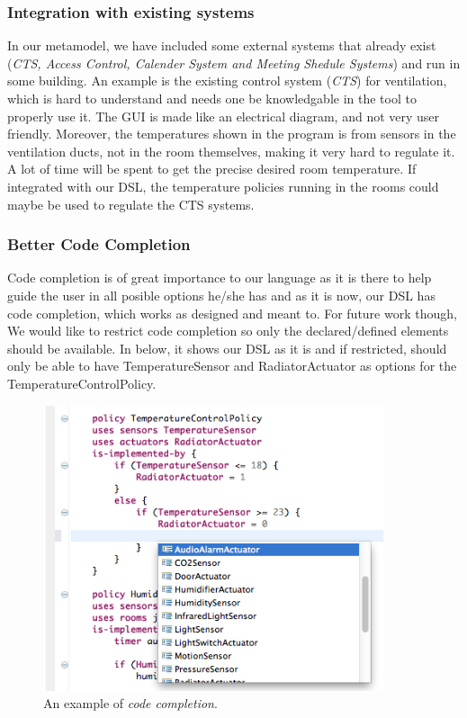 \documentclass{llncs}
\begin{document}
\subsubsection{Integration with existing systems}\label{subsec:integration}
In our metamodel, we have included some external systems that already exist (\textit{CTS, Access Control, Calender System and Meeting Shedule Systems}) and run in some building. An example is the existing control system (\textit{CTS}) for ventilation, which is hard to understand and needs one be knowledgable in the tool to properly use it. The GUI is made like an electrical diagram, and not very user friendly. Moreover, the temperatures shown in the program is from sensors in the ventilation ducts, not in the room themselves, making it very hard to regulate it. A lot of time will be spent to get the precise desired room temperature. If integrated with our DSL, the temperature policies running in the rooms could maybe be used to regulate the CTS systems.

\subsubsection{Better Code Completion}\label{subsec:codecompletion}
Code completion is of great importance to our language as it is there to help guide the user in all posible options he/she has and as it is now, our DSL has code completion, which works as designed and meant to. For future work though, We would like to restrict code completion so only the declared/defined elements should be available. In  below, it shows our DSL as it is and if restricted, should only be able to have TemperatureSensor and RadiatorActuator as options for the TemperatureControlPolicy.

\begin{figure}
  \centering
    \includegraphics[width=10cm]{dsl-code-completion.png} 
	\caption{An example of \textit{code completion}.}
	\label{fig:code-completion}
\end{figure}
\end{document}
